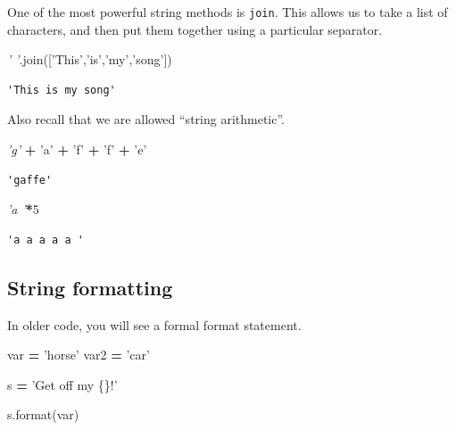 \documentclass[
  letterpaper,
]{scrbook}
\newenvironment{Shaded}{\begin{snugshade}}{\end{snugshade}}
\newcommand{\BuiltInTok}[1]{#1}
\newcommand{\CommentTok}[1]{\textcolor[rgb]{0.56,0.35,0.01}{\textit{#1}}}
\newcommand{\DecValTok}[1]{\textcolor[rgb]{0.00,0.00,0.81}{#1}}
\newcommand{\NormalTok}[1]{#1}
\newcommand{\OperatorTok}[1]{\textcolor[rgb]{0.81,0.36,0.00}{\textbf{#1}}}
\newcommand{\SpecialCharTok}[1]{\textcolor[rgb]{0.00,0.00,0.00}{#1}}
\newcommand{\StringTok}[1]{\textcolor[rgb]{0.31,0.60,0.02}{#1}}
\begin{document}
One of the most powerful string methods is \texttt{join}. This allows us to take a list of characters, and then
put them together using a particular separator.

\begin{Shaded}
\begin{Highlighting}[]
\CommentTok{' '}\NormalTok{.join([}\StringTok{'This'}\NormalTok{,}\StringTok{'is'}\NormalTok{,}\StringTok{'my'}\NormalTok{,}\StringTok{'song'}\NormalTok{])}
\end{Highlighting}
\end{Shaded}

\begin{verbatim}
'This is my song'
\end{verbatim}

Also recall that we are allowed ``string arithmetic''.

\begin{Shaded}
\begin{Highlighting}[]
\CommentTok{'g'} \OperatorTok{+} \StringTok{'a'} \OperatorTok{+} \StringTok{'f'} \OperatorTok{+} \StringTok{'f'} \OperatorTok{+} \StringTok{'e'}
\end{Highlighting}
\end{Shaded}

\begin{verbatim}
'gaffe'
\end{verbatim}

\begin{Shaded}
\begin{Highlighting}[]
\CommentTok{'a '}\OperatorTok{*}\DecValTok{5}
\end{Highlighting}
\end{Shaded}

\begin{verbatim}
'a a a a a '
\end{verbatim}

\hypertarget{string-formatting}{%
\subsection{String formatting}\label{string-formatting}}

In older code, you will see a formal format statement.

\begin{Shaded}
\begin{Highlighting}[]
\NormalTok{var }\OperatorTok{=} \StringTok{'horse'}
\NormalTok{var2 }\OperatorTok{=} \StringTok{'car'}

\NormalTok{s }\OperatorTok{=} \StringTok{'Get off my }\SpecialCharTok{\{\}}\StringTok{!'}

\NormalTok{s.}\BuiltInTok{format}\NormalTok{(var)}
\end{Highlighting}
\end{Shaded}
\end{document}
